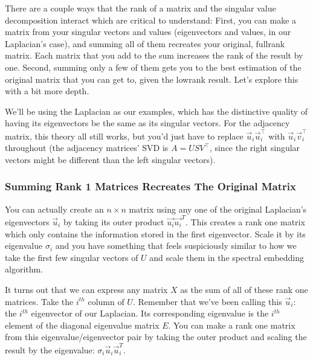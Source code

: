 \documentclass[letterpaper,10pt,english]{jupyterBook}
\begin{document}
\sphinxAtStartPar
There are a couple ways that the rank of a matrix and the singular value decomposition interact which are critical to understand: First, you can make a matrix from your singular vectors and values (eigenvectors and values, in our Laplacian’s case), and summing all of them recreates your original, full\sphinxhyphen{}rank matrix. Each matrix that you add to the sum increases the rank of the result by one. Second, summing only a few of them gets you to the best estimation of the original matrix that you can get to, given the low\sphinxhyphen{}rank result. Let’s explore this with a bit more depth.

\sphinxAtStartPar
We’ll be using the Laplacian as our examples, which has the distinctive quality of having its eigenvectors be the same as its singular vectors. For the adjacency matrix, this theory all still works, but you’d just have to replace \(\vec u_i \vec u_i^\top\) with \(\vec u_i \vec v_i^\top\) throughout (the adjacency matrices’ SVD is \(A = U S V^\top\), since the right singular vectors might be different than the left singular vectors).


\subsubsection{Summing Rank 1 Matrices Recreates The Original Matrix}
\label{\detokenize{representations/ch6/spectral-embedding:summing-rank-1-matrices-recreates-the-original-matrix}}
\sphinxAtStartPar
You can actually create an \(n \times n\) matrix using any one of the original Laplacian’s eigenvectors \(\vec u_i\) by taking its outer product \(\vec{u_i} \vec{u_i}^T\). This creates a rank one matrix which only contains the information stored in the first eigenvector. Scale it by its eigenvalue \(\sigma_i\) and you have something that feels suspiciously similar to how we take the first few singular vectors of \(U\) and scale them in the spectral embedding algorithm.

\sphinxAtStartPar
It turns out that we can express any matrix \(X\) as the sum of all of these rank one matrices.
Take the \(i^{th}\) column of \(U\). Remember that we’ve been calling this \(\vec u_i\): the \(i^{th}\) eigenvector of our Laplacian. Its corresponding eigenvalue is the \(i^{th}\) element of the diagonal eigenvalue matrix \(E\). You can make a rank one matrix from this eigenvalue/eigenvector pair by taking the outer product and scaling the result by the eigenvalue: \(\sigma_i \vec u_i \vec u_i^T\).
\end{document}
